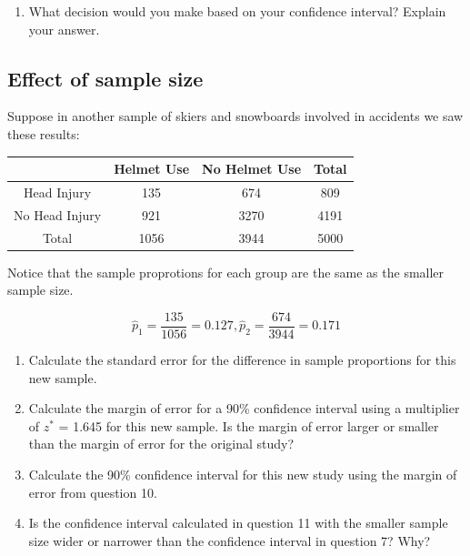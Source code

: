 \documentclass[
]{report}
\providecommand{\tightlist}{%
  \setlength{\itemsep}{0pt}\setlength{\parskip}{0pt}}
\begin{document}
\vspace{0.8in}

\begin{enumerate}
\def\labelenumi{\arabic{enumi}.}
\setcounter{enumi}{7}
\tightlist
\item
  What decision would you make based on your confidence interval? Explain your answer.
  \vspace{0.5in}
  \newpage
\end{enumerate}

\hypertarget{effect-of-sample-size-1}{%
\subsection{Effect of sample size}\label{effect-of-sample-size-1}}

Suppose in another sample of skiers and snowboards involved in accidents we saw these results:

\begin{longtable}[]{@{}cccc@{}}
\toprule()
& Helmet Use & No Helmet Use & Total \\
\midrule()
\endhead
Head Injury & 135 & 674 & 809 \\
No Head Injury & 921 & 3270 & 4191 \\
Total & 1056 & 3944 & 5000 \\
\bottomrule()
\end{longtable}

Notice that the sample proprotions for each group are the same as the smaller sample size.

\[\hat{p}_1 = \frac{135}{1056}=0.127, \hat{p}_2 = \frac{674}{3944}=0.171\]

\begin{enumerate}
\def\labelenumi{\arabic{enumi}.}
\setcounter{enumi}{8}
\item
  Calculate the standard error for the difference in sample proportions for this new sample.
  \vspace{0.8in}
\item
  Calculate the margin of error for a 90\% confidence interval using a multiplier of \(z^*\) = 1.645 for this new sample. Is the margin of error larger or smaller than the margin of error for the original study?
  \vspace{.8in}
\item
  Calculate the 90\% confidence interval for this new study using the margin of error from question 10.\\
  \vspace{.8in}
\item
  Is the confidence interval calculated in question 11 with the smaller sample size wider or narrower than the confidence interval in question 7? Why?
  \vspace{.8in}
\end{enumerate}
\end{document}

